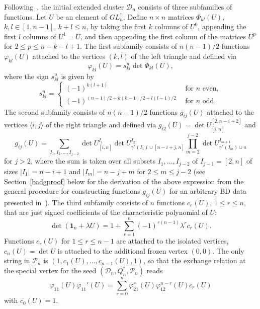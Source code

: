 \documentclass{amsart}
\theoremstyle{definition}
\theoremstyle{remark}
\numberwithin{equation}{section}
\numberwithin{theorem}{section}
\def\DD{{\mathcal D}}
\def\PP{{\mathcal P}}
\def\la{\langle}
\def\ra{\rangle}
\def\fy{\varphi}
\def\one{\mathbf 1}
\begin{document}
Following~\cite[Section~7.2]{GV}, the initial extended cluster $\DD_n$ consists of three subfamilies of functions. 
Let $U$ be an element of $GL_n^\dag$. 
Define $n\times n$ matrices $\Phi_{kl}(U)$, $k,l\in[1,n-1]$, $k+l\le n$, by taking the first $k$ columns of $U^0$, appending the first $l$ columns of $U^1=U$, and then appending the first column of the matrices $U^p$ for $2\le p\le n-k-l+1$. The first subfamily consists of $n(n-1)/2$ functions $\fy_{kl}(U)$ attached to the vertices $(k,l)$ of the left triangle and defined
via
\begin{equation}\label{phidef}
\fy_{kl}(U)=s_{kl}^n\det\Phi_{kl}(U),
\end{equation}
 where the sign $s_{kl}^n$ is given by
\begin{equation}\label{signdef}
s_{kl}^n=\begin{cases}
(-1)^{k(l+1)} \ & \ \text{for $n$ even},\\
(-1)^{(n-1)/2 + k(k-1)/2 + l(l-1)/2} \ & \ \text{for $n$ odd}.
\end{cases}
\end{equation}   
The second subfamily consists of $n(n-1)/2$ functions $g_{ij}(U)$ attached to the vertices $\la i,j\ra $ of the right triangle 
and defined via $g_{i2}(U)=\det U_{[i,n]}^{[2,n-i+2]}$ and 
\begin{equation}\label{gdef}
g_{ij} (U) =
 \sum_{I_1,I_2,\dots, I_{j-2}}
\det U^{I_1}_{[i,n]} \det U_{\gamma^*(I_1)\cup [n-i+j,n]}^{I_2} 
\prod_{m=2}^{j-2}\det U_{\gamma^*(I_m)\cup n}^{I_{m+1}}
\end{equation} 
for $j>2$, where the sum is taken over all subsets $I_1,\dots,I_{j-2}$ of $I_{j-1}=[2,n]$ of sizes $|I_1|=n-i+1$ and $|I_m|=n-j+m$ for
$2\le m\le j-2$ (see Section~\ref{badgproof} below for the derivation of the above expression from the general procedure
for constructing functions $g_{ij}(U)$ for an arbitrary BD data presented in~\cite{GV}).
The third subfamily consists
of $n$ functions $c_r(U)$, $1\le r \le n$, that are just signed coefficients of the characteristic polynomial of $U$:
\begin{equation}\label{cdef}
\det(\one_n+\lambda U)=1+\sum_{r=1}^n (-1)^{r(n-1)}\lambda^r c_r(U).
\end{equation}
Functions $c_r(U)$ for $1\le r\le n-1$ are attached to the isolated vertices, $c_n(U)=\det U$ is attached to the
additional frozen vertex $(0,0)$. The only string in $\PP_n$ is $(1, c_1(U),\allowbreak \dots,c_{n-1}(U),1)$, so that the exchange
relation at the special vertex for the seed $(\DD_n, Q_n^\dag, \PP_n)$ reads
$$
\fy_{11}(U)\fy_{11}'(U)=\sum_{r=0}^n \fy_{21}^r(U)\fy_{12}^{n-r}(U)c_r(U)
$$
with $c_0(U)=1$.
\end{document}
